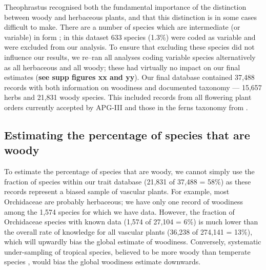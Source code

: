 \documentclass[a4paper,12pt]{article}
\begin{document}
Theophrastus recognised both the fundamental importance of the
distinction between woody and herbaceous plants, and that this
distinction is in some cases difficult to make.  There are a number of
species which are intermediate (or variable) in form
\citep{beaulieuHiddenRates}; in this dataset 633 species (1.3\%) were
coded as variable and were excluded from our analysis. To ensure that 
excluding these species did not influence our results, we re--ran all
analyses coding variable species alternatively  as all herbaceous and all
woody; these had virtually no impact on our final estimates
(\textbf{see supp figures xx and yy}).
%
Our final database contained 37,488 records with both information on
woodiness and documented taxonomy --- 15,657 herbs and 21,831 woody
species.  This included records from all flowering plant orders
currently accepted by APG-III \citep{APG3} and those in the ferns
taxonomy from \citet{apweb}.


\subsection{Estimating the percentage of species that are woody}

To estimate the percentage of species that are woody, we cannot simply
use the fraction of species within our trait database (21,831 of
37,488 = 58\%) as these records represent a biased sample of vascular
plants.
For example, most Orchidaceae are probably herbaceous; we have only
one record of woodiness among the 1,574 species for which we have
data.
However, the fraction of Orchidaceae species with known data (1,574 of
27,104 = 6\%)
is much lower than the overall rate of knowledge for all vascular
plants (36,238 of 274,141 = 13\%), which will upwardly bias the global
estimate of woodiness.
%
Conversely, systematic under-sampling of tropical species, believed to
be more woody than temperate species \citep{Molesheihgt}, would bias
the global woodiness estimate downwards.
\end{document}
